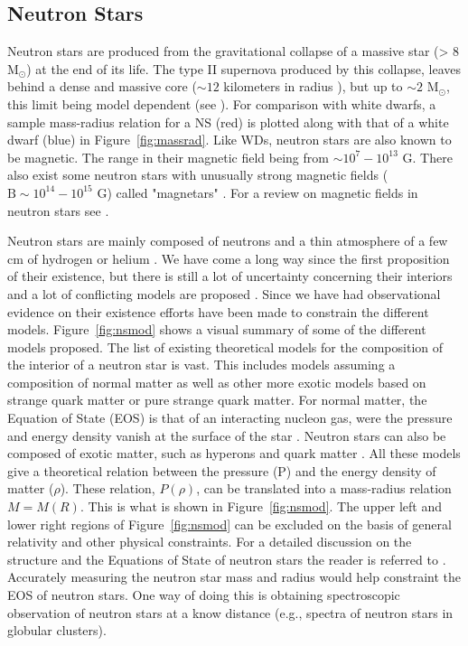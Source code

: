 \subsection{Neutron Stars}\label{sec:ns}

Neutron stars are produced from the gravitational collapse of a massive star (> 8 M$_\odot$)\citep{de2008stars} at the end of its life. The type II supernova produced by this collapse, leaves behind a dense and massive core ($\sim 12$ kilometers in radius \citealt{de2008stars}), but up to $\sim 2$ M$_\odot$, this limit being model dependent (see \citealt{lattimer_neutron_2007}). For comparison with white dwarfs, a sample mass-radius relation for a NS (red) is plotted along with that of a white dwarf (blue) in Figure~\ref{fig:massrad}. Like WDs, neutron stars are also known to be magnetic. The range in their magnetic field being from $\sim 10^7 - 10^{13}$ G. There also exist some neutron stars with unusually strong magnetic fields ($\text{B}\sim 10^{14} - 10^{15}\text{ G}$) called "magnetars" \citep{duncan_formation_1992}. For a review on magnetic fields in neutron stars see \cite{reisenegger_magnetic_2005}. 


Neutron stars are mainly composed of neutrons and a thin atmosphere of a few cm of hydrogen or helium \citep{zavlin_ns_1996}. We have come a long way since the first proposition of their existence, but there is still a lot of  uncertainty concerning their interiors and a lot of conflicting models are proposed \citep{lattimer_neutron_2007}. Since we have had observational evidence on their existence \citep{hewish_pulsar_1968} efforts have been made to constrain the different models. Figure~\ref{fig:nsmod} shows a visual summary of some of the different models proposed. The list of existing theoretical models for the  composition of the interior of a neutron star is vast. This includes models assuming a composition of normal matter as well as other more exotic models based on strange quark matter or pure strange quark matter. For normal matter, the Equation of State (EOS) is that of an interacting nucleon gas, were the pressure and energy density vanish at the surface of the star \citep{lattimereos2001}. Neutron stars can also be composed of exotic matter, such as hyperons and quark matter \citep{cleymans_physics_1999}. All these models give a theoretical relation between the pressure (P) and the energy density of matter ($\rho$). These relation, $P(\rho)$, can be translated into a mass-radius relation $M=M(R)$. This is what is shown in Figure~\ref{fig:nsmod}. The upper left and lower right regions of Figure~\ref{fig:nsmod} can be excluded on the basis of general relativity and other physical constraints. For a detailed discussion on the structure and the Equations of State of neutron stars the reader is referred to \cite{lattimereos2001}. Accurately measuring the neutron star mass and radius would help constraint the EOS of neutron stars. One way of doing this is obtaining spectroscopic observation of neutron stars at a know distance (e.g., spectra of neutron stars in globular clusters).  

